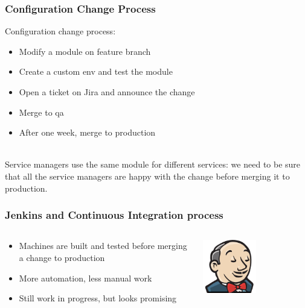 \documentclass[aspectratio=169]{beamer}
\begin{document}

\begin{frame}
    \frametitle{Configuration Change Process}
    Configuration change process:
    \begin{itemize}
        \item Modify a module on feature branch
        \item Create a custom env and test the module
        \item Open a ticket on Jira and announce the change
        \item Merge to qa
        \item After one week, merge to production
    \end{itemize} \\[2em]

    Service managers use the same module for different services: we need to 
    be sure that all the service managers are happy with the change before 
    merging it to production.
\end{frame}


\begin{frame}
    \frametitle{Jenkins and Continuous Integration process}
    \begin{minipage}[T]{0.95\textwidth}
        \begin{columns}
            \begin{column}{0.5\textwidth}
                \begin{itemize}
                    \item Machines are built and tested before merging a 
                        change to production
                    \item More automation, less manual work
                    \item Still work in progress, but looks promising
                \end{itemize}
            \end{column}
            \begin{column}{0.5\textwidth}
                \begin{center}
                    \includegraphics[width=0.5\textwidth]{Jenkins_headshot.png}
                \end{center}
            \end{column}
        \end{columns}
    \end{minipage}
\end{frame}
\end{document}
